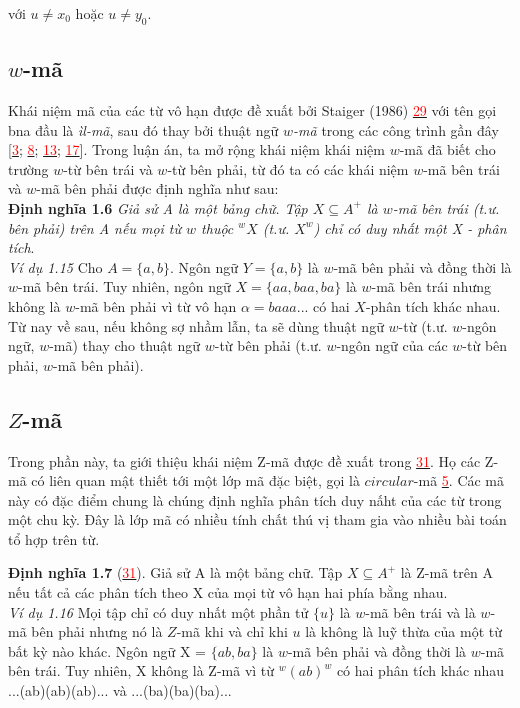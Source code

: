 \begin{flushleft}
với $u \ne x_0$ hoặc $u \ne y_0$.
\subsection{$w$-mã}
Khái niệm mã của các từ vô hạn được đề xuất bởi Staiger (1986) \hyperlink{page.81}{\textcolor{red}{29}} với tên gọi bna đầu là \textit{ìl-mã}, sau đó thay bởi thuật ngữ \textit{$w$-mã} trong các công trình gần đây [\hyperlink{page.81}{\textcolor{red}{3}}; \hyperlink{page.81}{\textcolor{red}{8}}; \hyperlink{page.81}{\textcolor{red}{13}}; \hyperlink{page.81}{\textcolor{red}{17}}]. Trong luận án, ta mở rộng khái niệm khái niệm $w$-mã đã biết cho trường $w$-từ bên trái và $w$-từ bên phải, từ đó ta có các khái niệm $w$-mã bên trái và $w$-mã bên phải được định nghĩa như sau: \\
\textbf{Định nghĩa 1.6}     \textit{Giả sử A là một bảng chữ. Tập $X \subseteq A^+$ là $w$-mã bên trái (t.ư. bên phải) trên A nếu mọi từ $w$ thuộc $^wX$ (t.ư. $X^w$) chỉ có duy nhất một X - phân tích}.\\
\textit{Ví dụ 1.15}     Cho $A=\{ a,b \}$. Ngôn ngữ $Y = \{ a,b \}$ là $w$-mã bên phải và đồng thời là $w$-mã bên trái. Tuy nhiên, ngôn ngữ $X = \{ aa,baa,ba \}$ là $w$-mã bên trái nhưng không là $w$-mã bên phải vì từ vô hạn $\alpha = baaa$... có hai $X$-phân tích khác nhau.\\
\hspace{10mm}Từ nay về sau, nếu không sợ nhầm lẫn, ta sẽ dùng thuật ngữ $w$-từ (t.ư. $w$-ngôn ngữ, $w$-mã) thay cho thuật ngữ $w$-từ bên phải (t.ư. $w$-ngôn ngữ của các $w$-từ bên phải, $w$-mã bên phải).\\
\subsection{$Z$-mã}
Trong phần này, ta giới thiệu khái niệm Z-mã được đề xuất trong \hyperlink{page.81}{\textcolor{red}{31}}. Họ các Z-mã có liên quan mật thiết tới một lớp mã đặc biệt, gọi là $circular$-mã \hyperlink{page.81}{\textcolor{red}{5}}. Các mã này có đặc điểm chung là chúng định nghĩa phân tích duy nấht của các từ trong một chu kỳ. Đây là lớp mã có nhiều tính chất thú vị tham gia vào nhiều bài toán tổ hợp trên từ.
\end{flushleft}
\begin{flushleft}
    \textbf{Định nghĩa 1.7} (\hyperlink{page.81}{\textcolor{red}{31}}). Giả sử A là một bảng chữ. Tập $X \subseteq A^+$ là Z-mã trên A nếu tất cả các phân tích theo X của mọi từ vô hạn hai phía bằng nhau.\\
    \textit{Ví dụ 1.16}     Mọi tập chỉ có duy nhất một phần tử $\{ u \}$ là $w$-mã bên trái và là $w$-mã bên phải nhưng nó là $Z$-mã khi và chỉ khi $u$ là không là luỹ thừa của một từ bất kỳ nào khác. Ngôn ngữ X = $\{ ab,ba \}$ là $w$-mã bên phải và đồng thời là $w$-mã bên trái. Tuy nhiên, X không là Z-mã vì từ $^w(ab)^w$ có hai phân tích khác nhau ...(ab)(ab)(ab)... và ...(ba)(ba)(ba)...
\end{flushleft}

